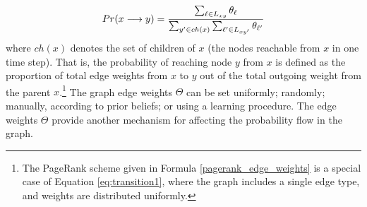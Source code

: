 \documentclass[11pt,oneside]{book}
\newcommand{\edge}[3]{{#1}\buildrel{#2}\over\longrightarrow{#3}}
\begin{document}
\begin{equation}
Pr(\edge{x}{}{y}) = 
{\sum_{\ell \in L_{xy}}\theta_{\ell} 
\over 
\sum_{y' \in ch(x)}\sum_{\ell' \in L_{xy'}}\theta_{\ell'}}
\label{eq:transition1}
\end{equation} 
where $ch(x)$ denotes the set of children of $x$ (the nodes reachable
from $x$ in one time step). That is, the probability of reaching node
$y$ from $x$ is defined as the proportion of total edge weights from
$x$ to $y$ out of the total outgoing weight from the parent
$x$.\footnote{The PageRank scheme given in Formula
  \ref{pagerank_edge_weights} is a special case of Equation
  \ref{eq:transition1}, where the graph includes a single edge type,
  and weights are distributed uniformly.} The graph edge weights
$\Theta$ can be set uniformly; randomly; manually, according to prior
beliefs; or using a learning procedure. The edge weights $\Theta$
provide another mechanism for affecting the probability flow in the
graph.
\fi

\end{document}
